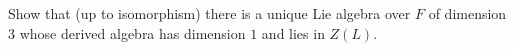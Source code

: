 Show that (up to isomorphism) there is a unique Lie algebra over $F$ of dimension $3$ whose derived algebra has dimension $1$ and lies in $Z(L)$.
